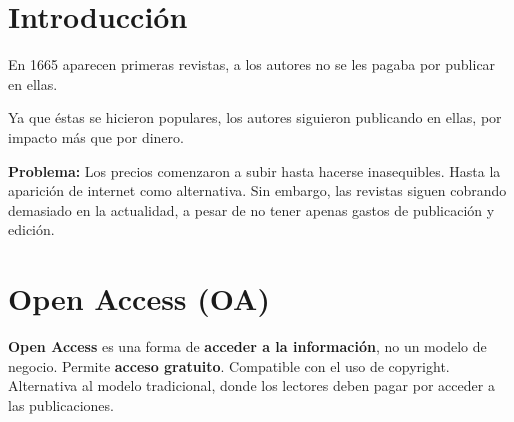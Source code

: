 \documentclass[a0,portrait]{a0poster}
\begin{document}

\begin{multicols}{2} %



\color{Black} %
\section*{Introducción}

\begin{tcolorbox}[colback=openaccess!5!white,colframe=openaccess!75!black,boxsep=1cm]
  \setlength{\parskip}{0.5cm}
  
  En 1665 aparecen primeras revistas, a los autores no se les pagaba por publicar en ellas.

  Ya que éstas se hicieron populares, los autores siguieron publicando en ellas, por impacto más que por dinero.

  \textbf{Problema:} Los precios comenzaron a subir hasta hacerse inasequibles. Hasta la aparición de internet como alternativa. Sin embargo, las revistas siguen cobrando demasiado en la actualidad, a pesar de no tener apenas gastos de publicación y edición.
  
\end{tcolorbox}

\section*{Open Access (OA)}
\begin{tcolorbox}[colback=openaccess!5!white,colframe=openaccess!75!black,boxsep=1cm]
  \setlength{\parskip}{0.5cm}
  
\textbf{Open Access} es una forma de \textbf{acceder a la información}, no un modelo de negocio. Permite \textbf{acceso gratuito}. Compatible con el uso de copyright. Alternativa al modelo tradicional, donde los lectores deben pagar por acceder a las publicaciones.


\end{tcolorbox}
\end{multicols}
\end{document}
